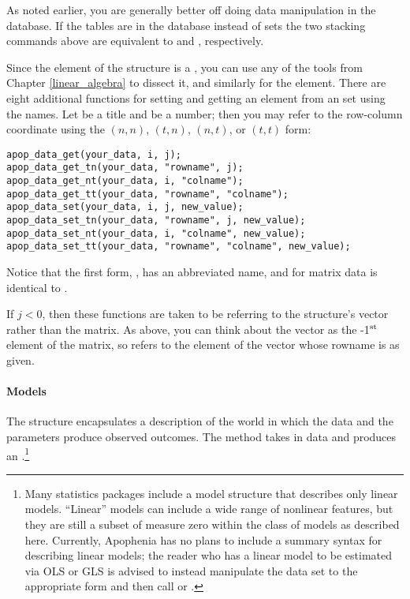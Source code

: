 As
noted earlier, you are generally better off doing data manipulation
in the database. If the tables are in the database instead of
 sets the two stacking commands above are equivalent
to 
and ,
respectively.

Since the  element of the  structure
is a , you can use any of the tools from Chapter
\ref{linear_algebra} to dissect it, and similarly for the
 element.
There are eight additional functions for setting and getting an element from an
 set using the names. Let  be a title and
 be a number; then you may refer to the row-column coordinate
using the $(n,n)$, $(t,n)$, $(n,t)$, or $(t,t)$ form:
\begin{lstlisting}
apop_data_get(your_data, i, j);
apop_data_get_tn(your_data, "rowname", j);
apop_data_get_nt(your_data, i, "colname");
apop_data_get_tt(your_data, "rowname", "colname");
apop_data_set(your_data, i, j, new_value);
apop_data_set_tn(your_data, "rowname", j, new_value);
apop_data_set_nt(your_data, i, "colname", new_value);
apop_data_set_tt(your_data, "rowname", "colname", new_value);
\end{lstlisting}
Notice that the first form, ,
has an abbreviated name, and for matrix data is identical to
. 

If $j<0$, then these functions are taken to be referring to the
 structure's vector rather than the matrix. As
above, you can think about the vector as the -1$^{\rm{st}}$ element of the
matrix, so 
 refers to the
element of the vector whose rowname is as given.



\paragraph{Models}
The  structure encapsulates a description of the world
in which the data and the parameters produce observed outcomes. The
 method takes in data and
produces an .\footnote{Many statistics
packages include a model structure that describes only linear models.
``Linear'' models can include a wide range of nonlinear features, but
they are still a subset of measure zero within the class of models as
described here. Currently, Apophenia has no plans to include a summary
syntax for describing linear models; the reader who has a linear model
to be estimated via OLS or GLS is advised to instead manipulate the
data set to the appropriate form and then call 
or .}

